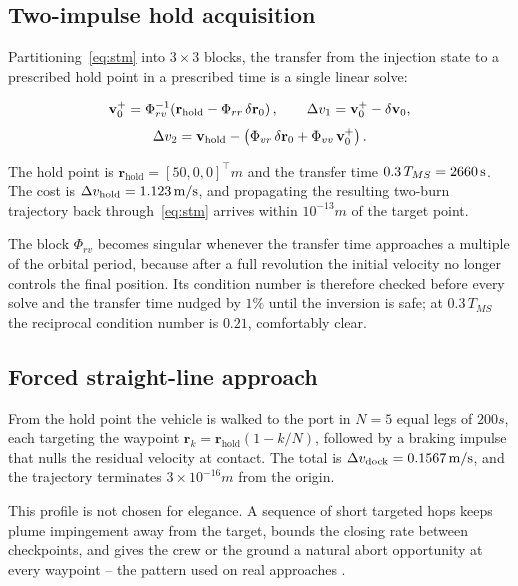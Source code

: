 \subsection{Two-impulse hold acquisition}
\label{sec:proximity:hold}

Partitioning~\eqref{eq:stm} into $3\times3$ blocks, the transfer from the
injection state to a prescribed hold point in a prescribed time is a single
linear solve:

\begin{equation}
\mathbf v_0^+ = \Phi_{rv}^{-1}\!\left(\mathbf r_{\text{hold}} - \Phi_{rr}\,\delta\mathbf r_0\right),
\qquad
\Delta v_1 = \mathbf v_0^+ - \delta\mathbf v_0,
\label{eq:target1}
\end{equation}
\begin{equation}
\Delta v_2 = \mathbf v_{\text{hold}} - \left(\Phi_{vr}\,\delta\mathbf r_0 + \Phi_{vv}\,\mathbf v_0^+\right).
\label{eq:target2}
\end{equation}

The hold point is $\mathbf r_{\text{hold}} = [50, 0, 0]^\top\unit{m}$ and the
transfer time $0.3\,T_{MS} = 2660\,\mathrm{s}$. The cost is
$\Delta v_{\text{hold}} = 1.123\,\mathrm{m/s}$, and propagating the resulting
two-burn trajectory back through~\eqref{eq:stm} arrives within
$10^{-13}\unit{m}$ of the target point.

The block $\Phi_{rv}$ becomes singular whenever the transfer time approaches a
multiple of the orbital period, because after a full revolution the initial
velocity no longer controls the final position. Its condition number is
therefore checked before every solve and the transfer time nudged by $1\%$ until
the inversion is safe; at $0.3\,T_{MS}$ the reciprocal condition number is
$0.21$, comfortably clear.

\subsection{Forced straight-line \vbar{} approach}

From the hold point the vehicle is walked to the port in $N = 5$ equal legs of
$200\unit{s}$, each targeting the waypoint
$\mathbf r_k = \mathbf r_{\text{hold}}(1 - k/N)$, followed by a braking impulse
that nulls the residual velocity at contact. The total is
$\Delta v_{\text{dock}} = 0.1567\,\mathrm{m/s}$, and the trajectory terminates
$3\times10^{-16}\unit{m}$ from the origin.

This profile is not chosen for elegance. A sequence of short targeted hops keeps
plume impingement away from the target, bounds the closing rate between
checkpoints, and gives the crew or the ground a natural abort opportunity at
every waypoint -- the pattern used on real \vbar{} approaches \cite{fehse}.

